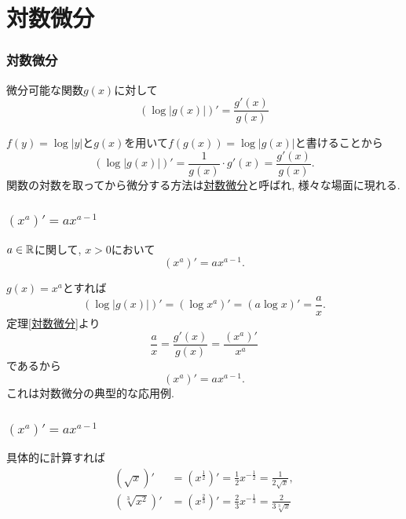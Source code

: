 

\section{対数微分}

\begin{frame}
\frametitle{対数微分}



\begin{Thm} \label{対数微分}
微分可能な関数$g(x)$に対して
$$(\log |g(x)|)'=\frac{g'(x)}{g(x)}$$
\end{Thm}

$f(y)=\log |y|$と$g(x)$を用いて$f(g(x))=\log|g(x)|$と書けることから
$$
(\log |g(x)|)'=\frac{1}{g(x)}\cdot g'(x)=\frac{g'(x)}{g(x)}. 
$$
関数の対数を取ってから微分する方法は\underline{対数微分}と呼ばれ, 様々な場面に現れる. 

\end{frame}




\begin{frame}
\frametitle{$(x^a)'=ax^{a-1}$}



\begin{Thm} 
$a \in \mathbb{R}$に関して, $x>0$において
$$
(x^a)'=ax^{a-1}.
$$
\end{Thm}
$g(x)=x^a$とすれば
$$
(\log |g(x)|)'= (\log x^a)'= (a \log x)'=\frac{a}{x}. 
$$
定理\ref{対数微分}より
$$
\frac{a}{x}=\frac{g'(x)}{g(x)}=\frac{(x^a)'}{x^a}
$$
であるから
$$
(x^a)'=a x^{a-1}. 
$$
これは対数微分の典型的な応用例. 

\end{frame}




\begin{frame}
\frametitle{$(x^a)'=ax^{a-1}$}


具体的に計算すれば
\begin{align*}
(\sqrt{x})' &= (x^{\frac{1}{2}})'=\frac{1}{2}x^{-\frac{1}{2}}= \frac{1}{2 \sqrt{x}}, \\
(\sqrt[3]{x^2})' &= (x^{\frac{2}{3}})'=\frac{2}{3}x^{-\frac{1}{3}}= \frac{2}{3 \sqrt[3]{x}}
\end{align*}


\end{frame}



